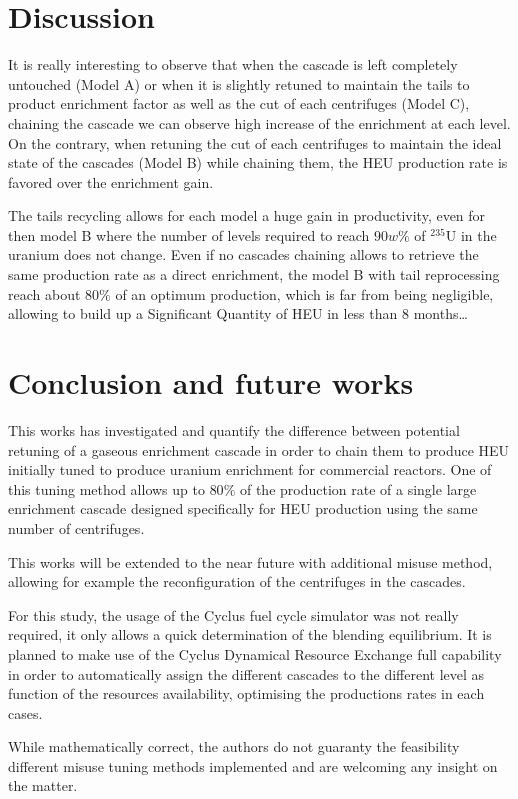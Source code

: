\section{Discussion}

It is really interesting to observe that when the cascade is left completely
untouched (Model A) or when it is slightly retuned to maintain the tails to
product enrichment factor as well as the cut of each centrifuges (Model C),
chaining the cascade we can observe high increase of the enrichment at each
level.  On the contrary, when retuning the cut of each centrifuges to maintain
the ideal state of the cascades (Model B) while chaining them, the \gls{HEU}
production rate is favored over the enrichment gain.

The tails recycling allows for each model a huge gain in productivity, even for
then model B where the number of levels required to reach $90w\%$ of $^{235}$U
in the uranium does not change. Even if no cascades chaining allows to retrieve
the same production rate as a direct enrichment, the model B with tail
reprocessing reach about $80\%$ of an optimum production, which is far from
being negligible, allowing to build up a Significant Quantity of \gls{HEU} in
less than 8 months\ldots


\section{Conclusion and future works}

This works has investigated and quantify the difference between potential
retuning of a gaseous enrichment cascade in order to chain them to produce
\gls{HEU} initially tuned to produce uranium enrichment for commercial reactors.
One of this tuning method allows up to $80\%$ of the production rate of a single
large enrichment cascade designed specifically for \gls{HEU} production using
the same number of centrifuges.

This works will be extended to the near future with additional misuse method,
allowing for example the reconfiguration of the centrifuges in the cascades.

For this study, the usage of the Cyclus fuel cycle simulator was not really
required, it only allows a quick determination of the blending equilibrium. It
is planned to make use of the Cyclus Dynamical Resource Exchange full capability
in order to automatically assign the different cascades to the different level
as function of the resources availability, optimising the productions rates in
each cases.

While mathematically correct, the authors do not guaranty the feasibility
different misuse tuning methods implemented and are welcoming any insight on
the matter.


